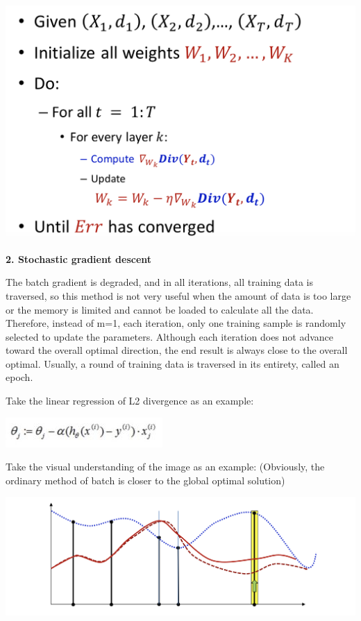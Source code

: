 \documentclass{article}
\begin{document}
	\includegraphics[scale=0.2]{84.png}
	
	\textbf{2. Stochastic gradient descent}
	
	The batch gradient is degraded, and in all iterations, all training data is traversed, so this method is not very useful when the amount of data is too large or the memory is limited and cannot be loaded to calculate all the data. Therefore, instead of m=1, each iteration, only one training sample is randomly selected to update the parameters. Although each iteration does not advance toward the overall optimal direction, the end result is always close to the overall optimal. Usually, a round of training data is traversed in its entirety, called an epoch.
	
	Take the linear regression of L2 divergence as an example:
	
	\includegraphics[scale=0.6]{85.png}
	
	Take the visual understanding of the image as an example: (Obviously, the ordinary method of batch is closer to the global optimal solution)
	
	\includegraphics[scale=0.2]{86.png}
	
\end{document}
